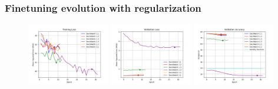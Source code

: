 \documentclass{beamer}
\begin{document}
\begin{frame}
    \frametitle{Finetuning evolution with regularization}
    \begin{figure}
        \centering
        \includegraphics[width=0.32\textwidth]{../report/entities/finetuned/adapted/train_losses.png}
        \includegraphics[width=0.32\textwidth]{../report/entities/finetuned/adapted/val_losses.png}
        \includegraphics[width=0.32\textwidth]{../report/entities/finetuned/adapted/val_accs.png}
    \end{figure}
\end{frame}
\end{document}
